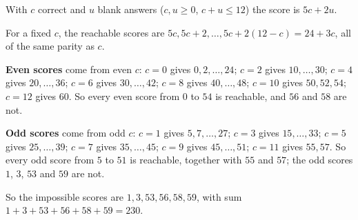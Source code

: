 With $c$ correct and $u$ blank answers ($c,u\ge0$, $c+u\le12$) the score is $5c+2u$.

For a fixed $c$, the reachable scores are $5c,5c+2,\dots,5c+2(12-c)=24+3c$, all of the same parity as $c$.

\textbf{Even scores} come from even $c$: $c=0$ gives $0,2,\dots,24$; $c=2$ gives $10,\dots,30$; $c=4$ gives $20,\dots,36$; $c=6$ gives $30,\dots,42$; $c=8$ gives $40,\dots,48$; $c=10$ gives $50,52,54$; $c=12$ gives $60$. So every even score from $0$ to $54$ is reachable, and $56$ and $58$ are not.

\textbf{Odd scores} come from odd $c$: $c=1$ gives $5,7,\dots,27$; $c=3$ gives $15,\dots,33$; $c=5$ gives $25,\dots,39$; $c=7$ gives $35,\dots,45$; $c=9$ gives $45,\dots,51$; $c=11$ gives $55,57$. So every odd score from $5$ to $51$ is reachable, together with $55$ and $57$; the odd scores $1$, $3$, $53$ and $59$ are not.

So the impossible scores are $1,3,53,56,58,59$, with sum $1+3+53+56+58+59=\boxed{230}$.
